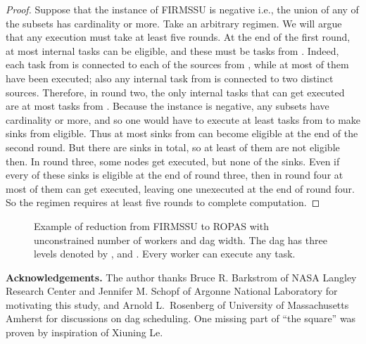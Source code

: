\documentclass[letterpaper,11pt]{article}
\newcommand{\FF}{\vspace*{\medskipamount}}
\begin{document}
\begin{proof}
Suppose that the instance of FIRMSSU is negative i.e., the union of any  of the subsets has cardinality  or more. Take an arbitrary regimen. We will argue that any execution must take at least five rounds. 
At the end of the first round, at most  internal tasks can be eligible, and these must be tasks from . Indeed, each task from  is connected to each of the  sources from , while at most  of them have been executed; also any internal task from  is connected to two distinct sources.
Therefore, in round two, the only internal tasks that can get executed are at most  tasks from . Because the instance is negative, any  subsets have cardinality  or more, and so one would have to execute at least  tasks from  to make  sinks from  eligible. Thus at most  sinks from  can become eligible at the end of the second round. But there are  sinks in total, so at least  of them are not eligible then.
In round three, some nodes get executed, but none of the  sinks. Even if every of these sinks is eligible at the end of round three, then in round four at most  of them can get executed, leaving one unexecuted at the end of round four. 
So the regimen requires at least five rounds to complete computation.
\end{proof}

\begin{figure}[htb]
\centerline{}
\caption{Example of reduction from FIRMSSU to ROPAS with unconstrained number of workers and dag width. The dag has three levels denoted by ,  and . Every worker can execute any task.
\label{f.reduction}}
\end{figure}

\FF
{\bf Acknowledgements.}
The author thanks Bruce R. Barkstrom of NASA Langley Research Center and Jennifer M. Schopf of Argonne National Laboratory for motivating this study, and Arnold L.~Rosenberg of University of Massachusetts Amherst for discussions on dag scheduling. One missing part of ``the square'' was proven by inspiration of Xiuning Le.
\FF
\end{document}
